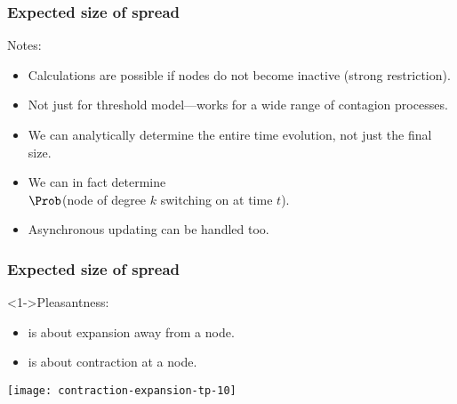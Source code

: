 \begin{frame}
  \frametitle{Expected size of spread}

  \begin{block}{Notes:}
    \begin{itemize}
    \item<1-> 
      Calculations are possible
      if nodes do not become inactive (strong restriction).
    \item<2->
      Not just for threshold model---works
      for a wide range of contagion processes.
    \item<3->
      We can analytically determine the entire time evolution,
      not just the final size.
    \item<4->
      We can in fact determine \\
      $\Prob$(node of degree $k$ switching on at time $t$).
    \item<5->
      Asynchronous updating can be handled too.
    \end{itemize}
  \end{block}

\end{frame}


\begin{frame}
  \frametitle{Expected size of spread}

  \begin{block}<1->{Pleasantness:}
    \begin{itemize}
    \item<1-> 
       is about \alert{expansion} away from
      a node.
    \item<2-> 
       is about \alert{contraction} at
      a node.
    \end{itemize}
    \texttt{[image: contraction-expansion-tp-10]}
  \end{block}

\end{frame}

